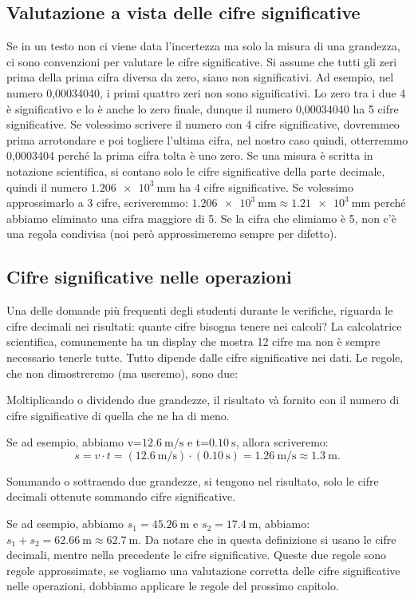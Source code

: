 \subsection{Valutazione a vista delle cifre significative}
Se in un testo non ci viene data l'incertezza ma solo la misura di una grandezza, ci sono convenzioni per valutare le cifre significative. Si assume che tutti gli zeri prima della prima cifra diversa da zero, siano non significativi. Ad esempio, nel numero 0,00034040, i primi quattro zeri non sono significativi. Lo zero tra i due 4 è significativo e lo è anche lo zero finale, dunque il numero 0,00034040 ha 5 cifre significative. Se volessimo scrivere il numero con 4 cifre significative, dovremmeo prima arrotondare e poi togliere l'ultima cifra, nel nostro caso quindi, otterremmo 0,0003404 perché la prima cifra tolta è uno zero. Se una misura è scritta in notazione scientifica, si contano solo le cifre significative della parte decimale, quindi il numero $\SI{1,206e+3}{\milli\meter}$ ha 4 cifre significative. Se volessimo approssimarlo a 3 cifre, scriveremmo: $\SI{1,206e+3}{\milli\meter} \approx \SI{1,21e+3}{\milli\meter}$ perché abbiamo eliminato una cifra maggiore di 5. Se la cifra che elimiamo è 5, non c'è una regola condivisa (noi però approssimeremo sempre per difetto).



\subsection{Cifre significative nelle operazioni}

Una delle domande più frequenti degli studenti durante le verifiche, riguarda le cifre decimali nei risultati: quante cifre bisogna tenere nei calcoli? La calcolatrice scientifica, comunemente ha un display che mostra 12 cifre ma non è sempre necessario tenerle tutte. Tutto dipende dalle cifre significative nei dati. Le regole, che non dimostreremo (ma useremo), sono due:
\begin{csp}
Moltiplicando o dividendo due grandezze, il risultato và fornito con il numero di cifre significative di quella che ne ha di meno.
\end{csp}
Se ad esempio, abbiamo v=$\SI{12,6}{\meter\per\second}$ e t=$\SI{0,10}{\second}$, allora scriveremo:
\[
s=v\cdot t =  \left(\SI{12,6}{\meter\per\second} \right)\cdot\left( \SI{0,10}{\second}\right) = \SI{1,26}{\meter\per\second} \approx \SI{1,3}{\meter}. 
\]
\begin{css}
Sommando o sottraendo due grandezze, si tengono nel risultato, solo le cifre decimali ottenute sommando cifre significative.
\end{css}
Se ad esempio, abbiamo $s_1=\SI{45,26}{\meter}$ e $s_2=\SI{17,4}{\meter}$, abbiamo: $s_1 +s_2 = \SI{62,66}{\meter} \approx \SI{62,7}{\meter}$. Da notare che in questa definizione si usano le cifre decimali, mentre nella precedente le cifre significative. Queste due regole sono regole approssimate, se vogliamo una valutazione corretta delle cifre significative nelle operazioni, dobbiamo applicare le regole del prossimo capitolo.

